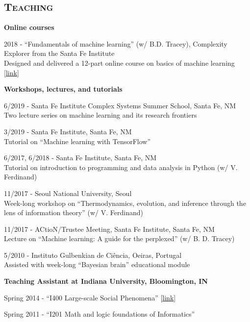 \documentclass[margin,line,centered]{res}
\begin{document}
\begin{resume}
\section{\textsc{Teaching}}

\textbf{Online courses}

2018 - ``Fundamentals of machine learning'' (w/ B.D. Tracey), Complexity Explorer from the Santa Fe Institute\\
Designed and delivered a 12-part online course on basics of machine learning {[}\href{https://www.complexityexplorer.org/courses/81-fundamentals-of-machine-learning}{link}{]}

\vspace{5pt}


\textbf{Workshops, lectures, and tutorials}

6/2019 - Santa Fe Institute Complex Systems Summer School, Santa Fe, NM\\
Two lecture series on machine learning and its research frontiers

3/2019 - Santa Fe Institute, Santa Fe, NM\\
Tutorial on ``Machine learning with TensorFlow''

6/2017, 6/2018 - Santa Fe Institute, Santa Fe, NM\\
Tutorial on introduction to programming and data analysis in Python (w/ V. Ferdinand)

11/2017 - Seoul National University, Seoul \\
Week-long workshop on ``Thermodynamics, evolution, and inference through the lens of information theory'' (w/ V. Ferdinand)

11/2017 - ACtioN/Trustee Meeting, Santa Fe Institute, Santa Fe, NM\\
Lecture on ``Machine learning: A guide for the perplexed'' (w/ B. D. Tracey)

5/2010 - Instituto Gulbenkian de Ciência, Oeiras, Portugal\\
Assisted with week-long ``Bayesian brain'' educational module

\vspace{5pt}

\textbf{Teaching Assistant at Indiana University, Bloomington, IN}

Spring 2014 - ``I400 Large-scale Social Phenomena'' {[}\href{http://tuvalu.santafe.edu/~simon/page11/page11.html}{link}{]} 

Spring 2011 - ``I201 Math and logic foundations of Informatics''


\end{resume}
\end{document}
